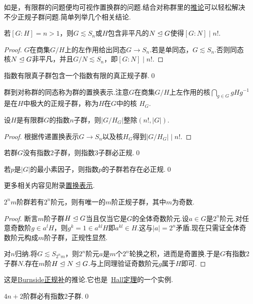 如是，有限群的问题便均可视作置换群的问题.结合对称群里的\hyperlink{cor:Index2Permutation}{推论}可以轻松解决不少正规子群问题.简单列举几个相关结论.
\begin{prop}
	若$[G:H]=n>1$，则$G\lesssim S_n$\footnotemark 或$H$包含非平凡的$N\trianglelefteq G$使得$[G:N]\mid n!$.
\end{prop}
\begin{proof}
	$G$在商集$G/H$上的左作用给出同态$G\to S_n$.若是单同态，$G\lesssim S_n$.否则同态核$N\trianglelefteq G$非平凡，并且$G/N\lesssim S_n$，即$[G:N]\mid n!$.
\end{proof}
\begin{cor*}
	指数有限真子群包含一个指数有限的真正规子群.\qed
\end{cor*}

群到对称群的同态称为群的{\heiti 置换表示}.注意$G$在商集$G/H$上左作用的核$\displaystyle\bigcap_{g\in G}gHg^{-1}$是在$H$中极大的正规子群，称为$H$在$G$中的{\heiti 核} $H_G$.

\begin{thm}[(Poincar\'e)]
	设$H$是有限群$G$的指数$n$子群，则$|G/H_G|$整除$(n!,|G|)$.
\end{thm}
\begin{proof}
	根据传递置换表示$G\to S_n$以及核$H_G$得到$|G/H_G|\mid n!$.
\end{proof}
\begin{cor}
	若群$G$没有指数2子群，则指数3子群必正规.\qed
\end{cor}
\begin{cor}
	若$p$是$|G|$的最小素因子，则指数$p$的子群若存在必正规.\qed
\end{cor}

更多相关内容见附录\hyperref[subsec:PermutationRepresentation]{置换表示}.
\begin{prop}
	$2^nm$阶群若有$2^n$阶元，则有唯一的$m$阶正规子群，其中$m$为奇数.
\end{prop}
\begin{proof}
	断言$m$阶子群$H\trianglelefteq G$当且仅当它是$G$的全体奇数阶元.设$a\in G$是$2^n$阶元.对任意奇数阶$g\in a^lH$，则$g^k=1\in a^{kl}H$即$a^{kl}\in H$.这与$|a|=2^n$矛盾.现在只需证全体奇数阶元构成$m$阶子群，正规性显然.

	对$n$归纳.将$G\lesssim S_{2^nm}$，则$2^n$阶元$a$是$m$个$2^n$轮换之积，进而是奇置换.于是$G$有指数2子群$N$.存在$m$阶$H\trianglelefteq N\trianglelefteq G$.与上同理验证奇数阶元$g$属于$H$即可.
\end{proof}
\begin{remark}
	这是\hyperlink{thm:BurnsideNormalpComplement}{Burnside正规补}的推论.它也是~\hyperlink{thm:Hall}{Hall定理}的一个实例.
\end{remark}
\begin{cor*}
	$4n+2$阶群必有指数2子群.\qed
\end{cor*}

